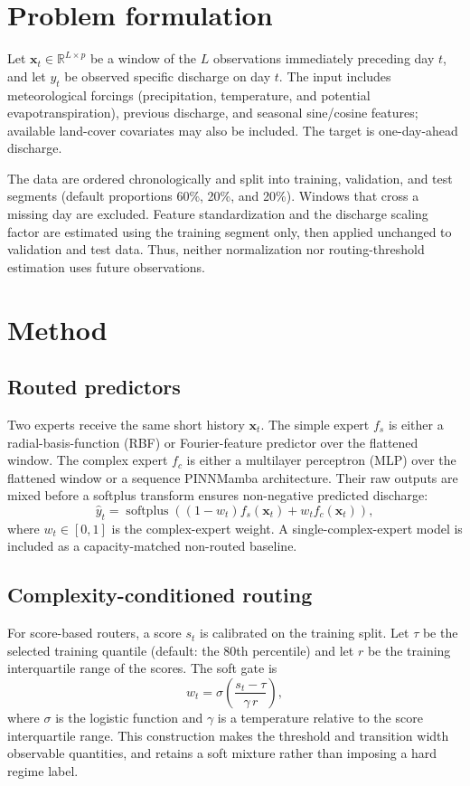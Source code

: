 \documentclass[11pt]{article}
\begin{document}
\section{Problem formulation}
Let $\mathbf{x}_t \in \mathbb{R}^{L\times p}$ be a window of the $L$ observations immediately preceding day $t$, and let $y_t$ be observed specific discharge on day $t$. The input includes meteorological forcings (precipitation, temperature, and potential evapotranspiration), previous discharge, and seasonal sine/cosine features; available land-cover covariates may also be included. The target is one-day-ahead discharge.

The data are ordered chronologically and split into training, validation, and test segments (default proportions 60\%, 20\%, and 20\%). Windows that cross a missing day are excluded. Feature standardization and the discharge scaling factor are estimated using the training segment only, then applied unchanged to validation and test data. Thus, neither normalization nor routing-threshold estimation uses future observations.

\section{Method}
\subsection{Routed predictors}
Two experts receive the same short history $\mathbf{x}_t$. The simple expert $f_s$ is either a radial-basis-function (RBF) or Fourier-feature predictor over the flattened window. The complex expert $f_c$ is either a multilayer perceptron (MLP) over the flattened window or a sequence PINNMamba architecture. Their raw outputs are mixed before a softplus transform ensures non-negative predicted discharge:
\begin{equation}
 \hat y_t = \operatorname{softplus}\!\left((1-w_t)f_s(\mathbf{x}_t)+w_t f_c(\mathbf{x}_t)\right),
 \label{eq:mixture}
\end{equation}
where $w_t\in[0,1]$ is the complex-expert weight. A single-complex-expert model is included as a capacity-matched non-routed baseline.

\subsection{Complexity-conditioned routing}
For score-based routers, a score $s_t$ is calibrated on the training split. Let $\tau$ be the selected training quantile (default: the 80th percentile) and let $r$ be the training interquartile range of the scores. The soft gate is
\begin{equation}
 w_t = \sigma\!\left(\frac{s_t-\tau}{\gamma\,r}\right),
 \label{eq:gate}
\end{equation}
where $\sigma$ is the logistic function and $\gamma$ is a temperature relative to the score interquartile range. This construction makes the threshold and transition width observable quantities, and retains a soft mixture rather than imposing a hard regime label.
\end{document}
